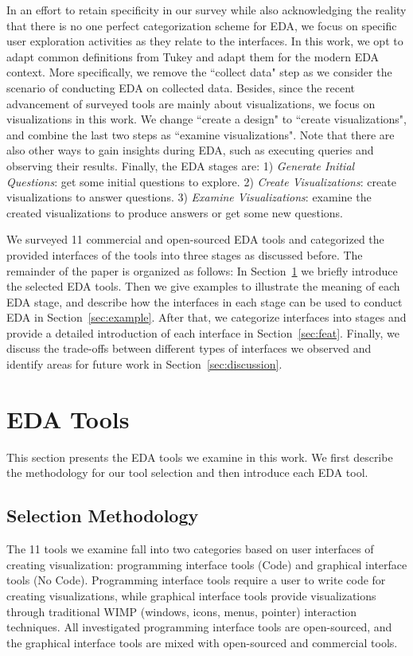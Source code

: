 \documentclass[11pt]{article}
\begin{document}
In an effort to retain specificity in our survey while also acknowledging the reality that there is no one perfect categorization scheme for EDA, we focus on specific user exploration activities as they relate to the interfaces. In this work, we opt to adapt common definitions from Tukey and adapt them for the modern EDA context. More specifically, we remove the ``collect data" step as we consider the scenario of conducting EDA on collected data. Besides, since the recent advancement of surveyed tools are mainly about visualizations, we focus on visualizations in this work. We change ``create a design" to ``create visualizations", and combine the last two steps as ``examine visualizations". Note that there are also other ways to gain insights during EDA, such as executing queries and observing their results. Finally, the EDA stages are: 1) \emph{Generate Initial Questions}: get some initial questions to explore. 2) \emph{Create Visualizations}: create visualizations to answer questions. 3) \emph{Examine Visualizations}: examine the created visualizations to produce answers or get some new questions. 

We surveyed 11 commercial and open-sourced EDA tools and categorized the provided interfaces of the tools into three stages as discussed before. The remainder of the paper is organized as follows: In Section~\ref{sec:tool} we briefly introduce the selected EDA tools. Then we give examples to illustrate the meaning of each EDA stage, and describe how the interfaces in each stage can be used to conduct EDA in Section~\ref{sec:example}. After that, we categorize interfaces into stages and provide a detailed introduction of each interface in Section~\ref{sec:feat}. Finally, we discuss the trade-offs between different types of interfaces we observed and identify areas for future work in Section~\ref{sec:discussion}.

\section{EDA Tools}
\label{sec:tool}


This section presents the EDA tools we examine in this work. We first describe the methodology for our tool selection and then introduce each EDA tool.

\subsection{Selection Methodology}
The 11 tools we examine fall into two categories based on user interfaces of creating visualization: programming interface tools (Code) and graphical interface tools (No Code). Programming interface tools require a user to write code for creating visualizations, while graphical interface tools provide visualizations through traditional WIMP (windows, icons, menus, pointer) interaction techniques. All investigated programming interface tools are open-sourced, and the graphical interface tools are mixed with open-sourced and commercial tools.
\end{document}
